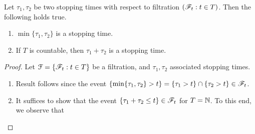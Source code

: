 \documentclass[a4paper,10pt,english]{article}
\begin{document}
Let $\tau_1,\tau_2$ be two stopping times with respect to filtration $(\mathscr{F}_t: t \in T)$.  
Then the following holds true. 
\begin{enumerate}[i\_]
\item $\min \{\tau_1,\tau_2\} $ is a stopping time. 
\item If $T$ is countable, then $\tau_1+\tau_2$ is a stopping time.
\end{enumerate}
\begin{proof}
Let $\mathcal{F} = \{\mathscr{F}_t : t \in T \} $ be a filtration, and $\tau_1,\tau_2$ associated stopping times. 
\begin{enumerate}[i\_]
\item Result follows since the event $\{ \min \{ \tau_1,\tau_2\} > t\} = \{\tau_1 > t\} \cap \{\tau_2 > t\} \in \mathscr{F}_t$. 
\item It suffices to show that the event $\{\tau_1+\tau_2 \leq  t\} \in \mathscr{F}_t$ for $T = \mathbb{N}$. 
To this end, we observe that 
\end{enumerate}
\end{proof}
\end{document}
